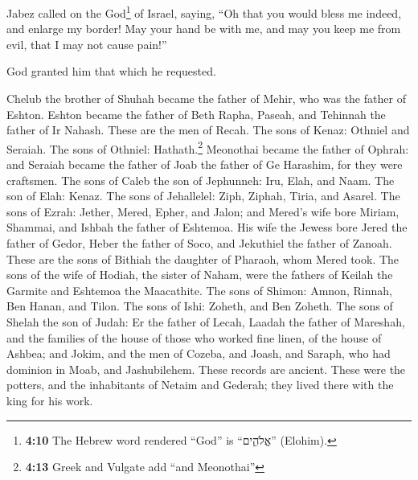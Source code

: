  Jabez called on the God\footnote{\textbf{4:10} The
  Hebrew word rendered ``God'' is ``אֱלֹהִ֑ים'' (Elohim).} of Israel,
saying, ``Oh that you would bless me indeed, and enlarge my border! May
your hand be with me, and may you keep me from evil, that I may not
cause pain!''

God granted him that which he requested.

 Chelub the brother of Shuhah became the father of Mehir,
who was the father of Eshton.  Eshton became the father
of Beth Rapha, Paseah, and Tehinnah the father of Ir Nahash. These are
the men of Recah.  The sons of Kenaz: Othniel and
Seraiah. The sons of Othniel: Hathath.\footnote{\textbf{4:13} Greek and
  Vulgate add ``and Meonothai''}  Meonothai became the
father of Ophrah: and Seraiah became the father of Joab the father of Ge
Harashim, for they were craftsmen.  The sons of Caleb the
son of Jephunneh: Iru, Elah, and Naam. The son of Elah: Kenaz.
 The sons of Jehallelel: Ziph, Ziphah, Tiria, and Asarel.
 The sons of Ezrah: Jether, Mered, Epher, and Jalon; and
Mered's wife bore Miriam, Shammai, and Ishbah the father of Eshtemoa.
 His wife the Jewess bore Jered the father of Gedor,
Heber the father of Soco, and Jekuthiel the father of Zanoah. These are
the sons of Bithiah the daughter of Pharaoh, whom Mered took.
 The sons of the wife of Hodiah, the sister of Naham,
were the fathers of Keilah the Garmite and Eshtemoa the Maacathite.
 The sons of Shimon: Amnon, Rinnah, Ben Hanan, and Tilon.
The sons of Ishi: Zoheth, and Ben Zoheth.  The sons of
Shelah the son of Judah: Er the father of Lecah, Laadah the father of
Mareshah, and the families of the house of those who worked fine linen,
of the house of Ashbea;  and Jokim, and the men of
Cozeba, and Joash, and Saraph, who had dominion in Moab, and
Jashubilehem. These records are ancient.  These were the
potters, and the inhabitants of Netaim and Gederah; they lived there
with the king for his work.

